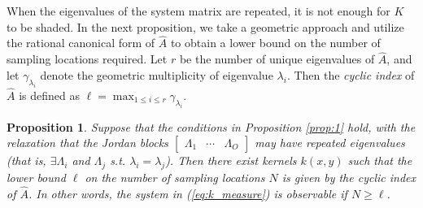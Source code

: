 \documentclass[letterpaper,12pt,peerreviewca,draftcls]{IEEEtran}
\newtheorem{proposition}{Proposition}
\newcommand{\la}{\lambda}
\newcommand{\kernel}{k}
\newcommand{\eval}{\la}
\newcommand{\empK}{\ensuremath{K}}
\newcommand{\nsamp}{N}
\renewcommand{\eqref}[1]{(\ref{eq:#1})}
\newcommand{\JorMul}{O}
\newcommand{\JorLa}{\Lambda}
\newcommand{\geomMult}[1]{\gamma_{#1}}
\newcommand{\nevals}{r}
\newcommand{\minmeas}{\ell}
\newcommand{\dualop}{A}
\newcommand{\dualopApprox}{\widehat{\dualop}}
\begin{document}
When the eigenvalues of the system matrix are repeated, it is not enough for $\empK$ to be shaded. 
In the next proposition, we take a geometric approach and utilize the rational canonical form  of $\dualopApprox$ to obtain a lower bound on the number of sampling locations required. Let $\nevals$ be the number of unique eigenvalues of $\dualopApprox$, and let $\geomMult{\eval_i}$ denote the geometric multiplicity of eigenvalue $\eval_i$. Then the \emph{cyclic index} of $\dualopApprox$ is defined as $\minmeas = \max_{1\leq i\leq\nevals}{\geomMult{\eval_i}}$\cite{wonham1974linear}.

\begin{proposition}\label{prop:2}
 Suppose that the conditions in Proposition \ref{prop:1} hold, with the relaxation that
 the Jordan blocks $\left[\begin{smallmatrix}
                           \JorLa_1 &\cdots & \JorLa_{\JorMul}
                          \end{smallmatrix}\right]$ may have 
 repeated eigenvalues (that is, $\exists \JorLa_i$ and $\JorLa_j$ s.t. $\eval_i = \eval_j$). Then there exist kernels $\kernel(x,y)$ such that the lower bound $\minmeas$ on the number of sampling locations $\nsamp$ is given by the cyclic index of $\dualopApprox$. In other words, the system in \eqref{k_measure} is observable if $ \nsamp \geq \ell$.
\end{proposition}
\end{document}
